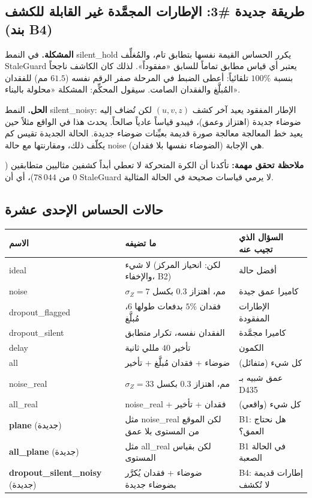 \documentclass[11pt,a4paper]{article}
\newcommand{\en}[1]{\textenglish{#1}}
\newcommand{\code}[1]{\LR{\texttt{#1}}}
\begin{document}
\subsection{طريقة جديدة \#3: الإطارات المجمَّدة غير القابلة للكشف (بند \en{B4})}
\textbf{المشكلة.} في النمط \en{silent\_hold} يكرر الحساس القيمة نفسها بتطابق تام، والمُغلِّف \en{StaleGuard} يعتبر أي قياس مطابق
تماماً للسابق «مفقوداً». لذلك كان الكاشف ناجحاً بنسبة $100\%$ تلقائياً: أعطى الضبط في المرحلة صفر الرقم نفسه ($61.5$ مم)
للفقدان المُبلَّغ والفقدان الصامت. سيقول المحكِّم: المشكلة «محلولة بالبناء».

\textbf{الحل.} النمط \en{silent\_noisy}: الإطار المفقود يعيد آخر كشف $(u,v,z)$ لكن تُضاف إليه ضوضاء جديدة (اهتزاز وعمق)،
فيبدو قياساً عادياً صالحاً. يحدث هذا في الواقع مثلاً حين يعيد خط المعالجة معالجة صورة قديمة بعيِّنات ضوضاء جديدة.
الحالة الجديدة \code{dropout\_silent\_noisy} تقيس كم يكلّف ذلك، ومقارنتها مع حالة \en{noise} (الضوضاء نفسها بلا فقدان) هي
الإجابة.

\textbf{ملاحظة تحقق مهمة:} تأكدنا أن الكرة المتحركة لا تعطي أبداً كشفين مثاليين متطابقين ($0$ من $78\,044$)، أي أن
\en{StaleGuard} لا يرمي قياسات صحيحة في الحالة المثالية.

\subsection{حالات الحساس الإحدى عشرة}
\begin{center}\small
\begin{tabularx}{\linewidth}{@{}l>{\raggedleft\arraybackslash}X>{\raggedleft\arraybackslash}X@{}}\toprule
الاسم & ما تضيفه & السؤال الذي تجيب عنه\\\midrule
\en{ideal} & لا شيء (لكن: انحياز المركز والإخفاء، \en{B2}) & أفضل حالة\\
\en{noise} & $\sigma_Z=7$ مم، اهتزاز $0.3$ بكسل & كاميرا عمق جيدة\\
\en{dropout\_flagged} & فقدان $5\%$ بدفعات طولها $6$، مُبلَّغ & الإطارات المفقودة\\
\en{dropout\_silent} & الفقدان نفسه، تكرار متطابق & كاميرا مجمَّدة\\
\en{delay} & تأخير $40$ مللي ثانية & الكمون\\
\en{all} & ضوضاء + فقدان مُبلَّغ + تأخير & كل شيء (متفائل)\\
\en{noise\_real} & $\sigma_Z=33$ مم، اهتزاز $0.3$ بكسل & عمق شبيه بـ \en{D435}\\
\en{all\_real} & \en{noise\_real} + فقدان + تأخير & كل شيء (واقعي)\\\midrule
\textbf{\en{plane}} (جديدة) & مثل \en{noise\_real} لكن الموقع من المستوى بلا عمق & \en{B1}: هل نحتاج العمق؟\\
\textbf{\en{all\_plane}} (جديدة) & مثل \en{all\_real} لكن بقياس المستوى & \en{B1} في الحالة الصعبة\\
\textbf{\en{dropout\_silent\_noisy}} (جديدة) & ضوضاء + فقدان يُكرَّر بضوضاء جديدة & \en{B4}: إطارات قديمة لا تُكشف\\\bottomrule
\end{tabularx}\end{center}
\end{document}
